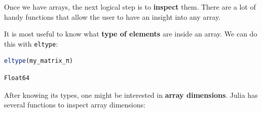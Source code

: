 \documentclass[
  notoc %
]{tufte-book}
\newcommand{\passthrough}[1]{#1}
\begin{document}
Once we have arrays, the next logical step is to \textbf{inspect} them.
There are a lot of handy functions that allow the user to have an
insight into any array.

It is most useful to know what \textbf{type of elements} are inside an
array. We can do this with \passthrough{\lstinline!eltype!}:

\begin{lstlisting}[language=Julia]
eltype(my_matrix_π)
\end{lstlisting}

\begin{lstlisting}[language=Output]
Float64
\end{lstlisting}

After knowing its types, one might be interested in \textbf{array
dimensions}. Julia has several functions to inspect array dimensions:
\end{document}
